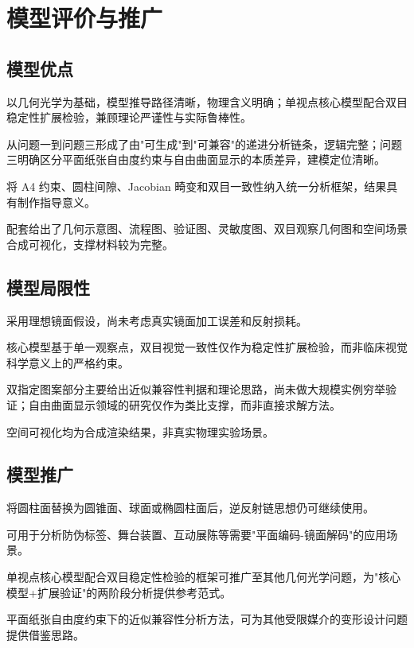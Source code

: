 \documentclass[a4paper,12pt]{ctexart}
\begin{document}
\section{模型评价与推广}

\subsection{模型优点}
\begin{compactitem}
\item 以几何光学为基础，模型推导路径清晰，物理含义明确；单视点核心模型配合双目稳定性扩展检验，兼顾理论严谨性与实际鲁棒性。
\item 从问题一到问题三形成了由"可生成"到"可兼容"的递进分析链条，逻辑完整；问题三明确区分平面纸张自由度约束与自由曲面显示的本质差异，建模定位清晰。
\item 将 A4 约束、圆柱间隙、Jacobian 畸变和双目一致性纳入统一分析框架，结果具有制作指导意义。
\item 配套给出了几何示意图、流程图、验证图、灵敏度图、双目观察几何图和空间场景合成可视化，支撑材料较为完整。
\end{compactitem}

\subsection{模型局限性}
\begin{compactitem}
\item 采用理想镜面假设，尚未考虑真实镜面加工误差和反射损耗。
\item 核心模型基于单一观察点，双目视觉一致性仅作为稳定性扩展检验，而非临床视觉科学意义上的严格约束。
\item 双指定图案部分主要给出近似兼容性判据和理论思路，尚未做大规模实例穷举验证；自由曲面显示领域的研究仅作为类比支撑，而非直接求解方法。
\item 空间可视化均为合成渲染结果，非真实物理实验场景。
\end{compactitem}

\subsection{模型推广}
\begin{compactitem}
\item 将圆柱面替换为圆锥面、球面或椭圆柱面后，逆反射链思想仍可继续使用。
\item 可用于分析防伪标签、舞台装置、互动展陈等需要"平面编码-镜面解码"的应用场景。
\item 单视点核心模型配合双目稳定性检验的框架可推广至其他几何光学问题，为"核心模型+扩展验证"的两阶段分析提供参考范式。
\item 平面纸张自由度约束下的近似兼容性分析方法，可为其他受限媒介的变形设计问题提供借鉴思路。
\end{compactitem}
\end{document}
